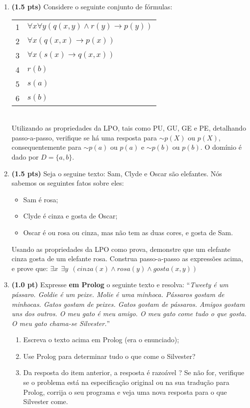 \documentclass[10pt, a4paper,final]{article}
\begin{document}
\begin{enumerate}
\item {\bf (1.5 pts)} Considere o seguinte conjunto de f\'ormulas: 

\begin{tabular}{ll}
1 &  $\forall x\forall y (q(x,y) \wedge r(y) \rightarrow p(y)) $ \\
2 &  $\forall x (q(x,x) \rightarrow p(x))  $ \\
3 &  $\forall x (s(x) \rightarrow q(x,x)) $ \\
4 &  $r(b)$ \\ 
5 &  $s(a)$ \\
6 &  $s(b)$ \\
\end{tabular}\\
Utilizando as propriedades da LPO, tais como PU, GU, GE e PE, detalhando passo-a-passo, verifique se há uma resposta para $\sim p(X)$ ou $p(X)$, 
consequentemente para $\sim p(a)$ ou $p(a)$ e $\sim p(b)$ ou $p(b)$.
O domínio é dado por $D=\{a,b\}$. 


\item {\bf (1.5 pts)} Seja o seguine texto: Sam, Clyde e Oscar são elefantes. N\'os sabemos os seguintes  fatos sobre eles:
\begin{itemize}
\setlength{\itemsep}{-2pt}
    \item Sam é rosa;
    \item Clyde é cinza e gosta de Oscar;
    \item Oscar é ou rosa ou cinza, mas não tem as duas cores, e gosta de Sam.
\end{itemize}
Usando as propriedades da LPO como prova, demonstre que um elefante cinza gosta de um elefante rosa. Construa passo-a-passo as expressões acima, e prove que: $\exists x \:\: \exists y \:\:(cinza(x) \wedge rosa(y) \wedge gosta(x,y))$


\item {\bf (1.0 pt)} Expresse {\bf em Prolog} o seguinte texto e resolva: 
``\textit{Tweety é um pássaro. Goldie é um peixe. Molie é uma minhoca. Pássaros gostam de minhocas. Gatos gostam de peixes. Gatos gostam de pássaros. Amigos gostam uns dos outros. O meu gato é meu amigo. O meu gato come tudo o que gosta. O meu gato chama-se Silvester.}''

\begin{enumerate}
  \item Escreva o texto acima em Prolog (era o enunciado);
  \item Use Prolog para determinar tudo o que come o Silvester?
  \item Da resposta do item anterior, a resposta é razoável ? Se não for, verifique se o problema está na especificação original ou na sua tradução para Prolog, corrija o seu programa e veja uma nova resposta para o que Silvester come.
\end{enumerate}




\end{enumerate}
\end{document}
